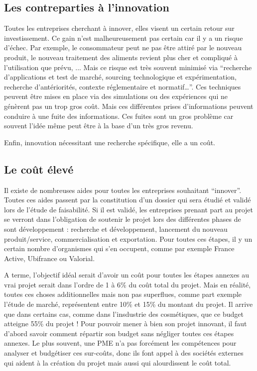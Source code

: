 \documentclass[a4paper,12pt]{report}
\begin{document}
		\subsection{Les contreparties à l'innovation}
		
		Toutes les entreprises cherchant à innover, elles visent un certain retour sur investissement. Ce gain n’est malheureusement pas certain car il y a un risque d'échec. Par exemple, le consommateur peut ne pas être attiré par le nouveau produit, le nouveau traitement des aliments revient plus cher et compliqué à l’utilisation que prévu, ... Mais ce risque est très souvent minimisé via “recherche d’applications et test de marché, sourcing technologique et expérimentation, recherche d’antériorités, contexte réglementaire et  normatif…”\cite{GlobalVision}. Ces techniques peuvent être mises en place via des simulations ou des expériences qui ne génèrent pas un trop gros coût.
		Mais ces différentes prises d’informations peuvent conduire à une fuite des informations. Ces fuites sont un gros problème car souvent l’idée même peut être à la base d’un très gros revenu.
		
		Enfin, innovation nécessitant une recherche spécifique, elle a un coût. 
		
			
		\subsection{Le coût élevé}
		Il existe de nombreuses aides pour toutes les entreprises souhaitant “innover”. Toutes ces aides passent par la constitution d’un dossier qui sera étudié et validé lors de l’étude de faisabilité. Si il est validé, les entreprises prenant part au projet se verront dans l’obligation de soutenir le projet lors des différentes phases de sont développement : recherche et développement, lancement du nouveau produit/service, commercialisation et exportation. Pour toutes ces étapes, il y un certain nombre d’organismes qui s’en occupent, comme par exemple France Active, Ubifrance ou Valorial\cite{AidesInnovation}. 
		
		A terme, l’objectif idéal serait d’avoir un coût pour toutes les étapes annexes au vrai projet serait dans l’ordre de 1 à 6\% du coût total du projet. Mais en réalité, toutes ces choses additionnelles mais non pas superflues, comme part exemple l’étude de marché, représentent entre 10\% et 15\% du montant du projet. Il arrive que dans certains cas, comme dans l’insdustrie des cosmétiques, que ce budget atteigne 55\% du projet ! Pour pouvoir mener à bien son projet innovant, il faut d’abord savoir comment répartir son budget sans négliger toutes ces étapes annexes. Le plus souvent, une PME n’a pas forcément les compétences pour analyser et budgétiser ces sur-coûts, donc ils font appel à des sociétés externes qui aident à la création du projet mais aussi qui alourdissent le coût total.
				
\end{document}
